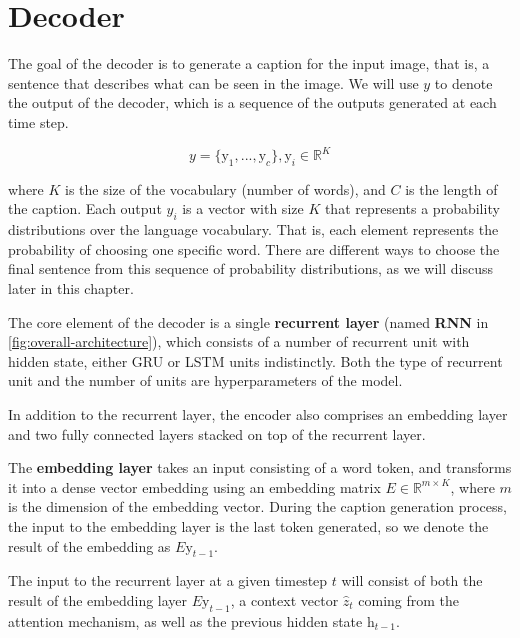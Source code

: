 \section{Decoder}\label{sec:decoder}

The goal of the decoder is to generate a caption for the input image, that is, a  sentence that describes what can be seen in the image. We will use $y$ to denote the output of the decoder, which is a sequence of the outputs generated at each time step.

$$y = \{\text{y}_1,..., \text{y}_c\}, \text{y}_i \in \mathbb{R}^K$$

where $K$ is the size of the vocabulary (number of words), and $C$ is the length of the caption.
Each output $y_i$ is a vector with size $K$ that represents a probability distributions over the language vocabulary. That is, each element represents the probability of choosing one specific word. There are different ways to choose the final sentence from this sequence of probability distributions, as we will discuss later in this chapter.

The core element of the decoder is a single \textbf{recurrent layer} (named \textbf{RNN} in \cref{fig:overall-architecture}), which consists of a number of recurrent unit with hidden state, either GRU or LSTM units indistinctly. Both the type of recurrent unit and the number of units are hyperparameters of the model.

In addition to the recurrent layer, the encoder also comprises an embedding layer and two fully connected layers stacked on top of the recurrent layer. 

The \textbf{embedding layer} takes an input consisting of a word token, and transforms it into a dense vector embedding using an embedding matrix $E \in \mathbb{R}^{m \times K}$, where $m$ is the dimension of the embedding vector. During the caption generation process, the input to the embedding layer is the last token generated, so we denote the result of the embedding as $E\text{y}_{t-1}$.

The input to the recurrent layer at a given timestep $t$ will consist of both the result of the embedding layer $E\text{y}_{t-1}$, a context vector $\hat{z}_t$ coming from the attention mechanism, as well as the previous hidden state $\text{h}_{t-1}$. 

